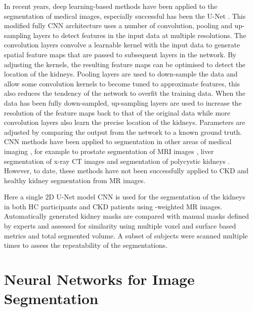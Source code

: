 In recent years, deep learning-based methods have been applied to the segmentation of medical images, especially successful has been the U-Net \cite{ronneberger_u-net_2015}. This modified fully \ac{CNN} architecture uses a number of convolution, pooling and up-sampling layers to detect features in the input data at multiple resolutions. The convolution layers convolve a learnable kernel with the input data to generate spatial feature maps that are passed to subsequent layers in the network. By adjusting the kernels, the resulting feature maps can be optimised to detect the location of the kidneys. Pooling layers are used to down-sample the data and allow some convolution kernels to become tuned to approximate features, this also reduces the tendency of the network to overfit the training data. When the data has been fully down-sampled, up-sampling layers are used to increase the resolution of the feature maps back to that of the original data while more convolution layers also learn the precise location of the kidneys. Parameters are adjusted by comparing the output from the network to a known ground truth. \ac{CNN} methods have been applied to segmentation in other areas of medical imaging \cite{lu_automatic_2017, sharma_automatic_2017, wachinger_deepnat_2018, fu_novel_2018}, for example to prostate segmentation of \ac{MRI} images \cite{hassanzadeh_convolutional_2019}, liver segmentation of x-ray \ac{CT} images \cite{li_h-denseunet_2018} and segmentation of polycystic kidneys \cite{kline_performance_2017, van_gastel_automatic_2019, shin_expert-level_2020}. However, to date, these methods have not been successfully applied to \ac{CKD} and healthy kidney segmentation from MR images. 

Here a single 2D U-Net model \ac{CNN} is used for the segmentation of the kidneys in both \ac{HC} participants and \ac{CKD} patients using \ttwo-weighted MR images. Automatically generated kidney masks are compared with manual masks defined by experts and assessed for similarity using multiple voxel and surface based metrics and total segmented volume. A subset of subjects were scanned multiple times to assess the repeatability of the segmentations.

\newpage

\section{Neural Networks for Image Segmentation}

